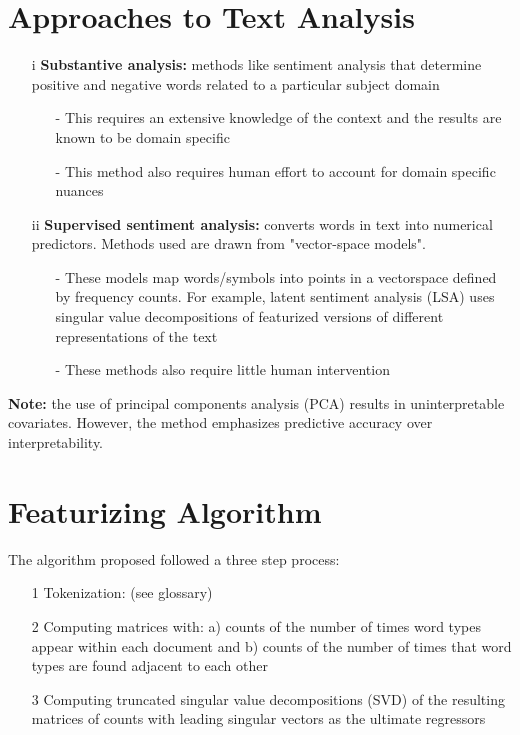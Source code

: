 \documentclass[11pt]{report}
\begin{document}
\section* { Approaches to Text Analysis}
\begin{itemize}

\item [i] {\bf Substantive analysis:} methods like sentiment analysis that determine positive and negative words related to a particular subject domain 
\begin{itemize}
\item [-] This requires an extensive knowledge of the context and the results are known to be domain specific
\item [-] This method also requires human effort to account for domain specific nuances
\end{itemize}
\item [ii] {\bf Supervised sentiment analysis:} converts words in text into numerical predictors. Methods used are drawn from "vector-space models". 
\begin{itemize}
\item [-] These models map words/symbols into points in a vectorspace defined by frequency counts. For example, latent sentiment analysis (LSA) uses singular value decompositions of featurized versions of different representations of the text
\item [-] These methods also require little human intervention
\end{itemize}
\end{itemize}
{\bf Note:} the use of principal components analysis (PCA) results in uninterpretable covariates. However, the method emphasizes predictive accuracy over interpretability.

\section { Featurizing Algorithm} 

The algorithm proposed followed a three step process:
\begin{itemize}
\item [1] Tokenization: (see glossary)
\item [2] Computing matrices with: a) counts of the number of times word types appear within each document and  b) counts of the number of times that word types are found adjacent to each other
\item [3] Computing truncated singular value decompositions (SVD) of the resulting matrices of counts with leading singular vectors as the ultimate regressors
\end{itemize}
\end{document}
